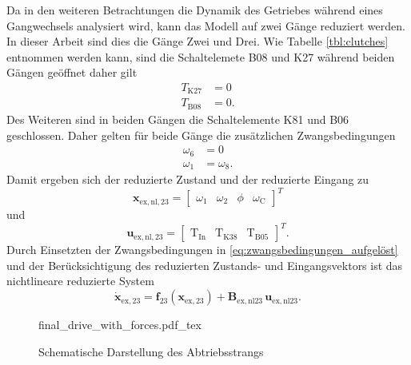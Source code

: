 Da in den weiteren Betrachtungen die Dynamik des Getriebes während eines Gangwechsels analysiert wird, kann das Modell auf zwei Gänge reduziert werden. In dieser Arbeit sind dies die Gänge Zwei und Drei. Wie Tabelle \ref{tbl:clutches} entnommen werden kann, sind die Schaltelemete B08 und K27 während beiden Gängen geöffnet daher gilt  
\begin{subequations}
\begin{align*}
T_\mathrm{K27} &= 0 \\
T_\mathrm{B08} &= 0.
\end{align*}
\end{subequations}
Des Weiteren sind in beiden Gängen die Schaltelemente K81 und B06 geschlossen. Daher gelten für beide Gänge die zusätzlichen Zwangsbedingungen
\begin{subequations}
\begin{align}
\omega_6 &= 0\\
\omega_1 &= \omega_8.
\end{align}
\end{subequations}
Damit ergeben sich der reduzierte Zustand und der reduzierte Eingang zu
\begin{equation}
\pmb{x}_\mathrm{ex,nl,23} = \begin{bmatrix} \omega_1 & \omega_2 & \phi & \omega_\mathrm{C}\end{bmatrix}^T
\end{equation}
und
\begin{equation}\label{eq:u_exnl23}
\pmb{u}_\mathrm{ex,nl,23} = \begin{bmatrix} \mathrm{T}_{\mathrm{In}} & \mathrm{T}_{\mathrm{K38}} & \mathrm{T}_{\mathrm{B05}} \end{bmatrix}^T.
\end{equation}
Durch Einsetzten der Zwangsbedingungen in \eqref{eq:zwangsbedingungen_aufgelöst} und der Berücksichtigung des reduzierten Zustands- und  Eingangsvektors ist das nichtlineare reduzierte System
\begin{equation}\label{eq:sys_nl23}
\dot{\pmb{x}}_\mathrm{ex,23} = \pmb{f}_{23}(\pmb{x}_\mathrm{ex,23}) + \pmb{B}_\mathrm{ex,nl23}\,\pmb{u}_\mathrm{ex,nl23}.
\end{equation}

\begin{figure}
   \centering
   \def\svgwidth{\columnwidth}
   {final_drive_with_forces.pdf_tex}
   \caption{Schematische Darstellung des Abtriebsstrangs}
   \label{fig:final_drive}
\end{figure}


